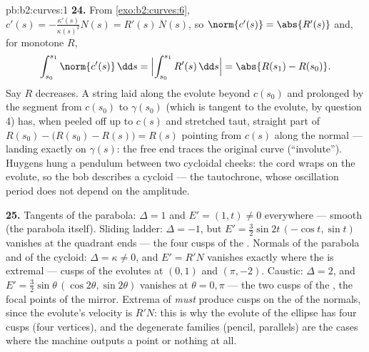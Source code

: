 \begin{solution}{pb:b2:curves:1}
\textbf{24.} From \cref{exo:b2:curves:6}, $c'(s) =
-\frac{\kappa'(s)}{\kappa(s)^2}N(s) = R'(s)\,N(s)$, so
$\norm{c'(s)} = \abs{R'(s)}$ and, for monotone $R$,
\[
\int_{s_0}^{s_1}\norm{c'(s)}\,\dd s =
\Bigl|\int_{s_0}^{s_1}R'(s)\,\dd s\Bigr| = \abs{R(s_1) -
R(s_0)} .
\]
Say $R$ decreases. A string laid along the evolute beyond
$c(s_0)$ and prolonged by the segment from $c(s_0)$ to
$\gamma(s_0)$ (which is tangent to the evolute, by question 4)
has, when peeled off up to $c(s)$ and stretched taut, straight
part of  $R(s_0) - \bigl(R(s_0) - R(s)\bigr) = R(s)$
pointing from $c(s)$ along the normal --- landing exactly on
$\gamma(s)$: the free end traces the original curve
(``involute''). Huygens hung a pendulum between two cycloidal
cheeks: the cord wraps on the evolute, so the bob describes a
cycloid --- the tautochrone, whose oscillation period does
not depend on the amplitude.

\textbf{25.} Tangents of the parabola: $\Delta = 1$ and $E' =
(1, t) \neq 0$ everywhere --- smooth  (the parabola
itself). Sliding ladder: $\Delta = -1$, but $E' =
\tfrac32\sin 2t\,(-\cos t, \sin t)$ vanishes at the quadrant
ends --- the four cusps of the . Normals of the
parabola and of the cycloid: $\Delta = \kappa \neq 0$, and
$E' = R'N$ vanishes exactly where the  is extremal
--- cusps of the evolutes at $(0,1)$ and $(\pi, -2)$. Caustic:
$\Delta = 2$, and $E' = \tfrac32\sin\theta\,(\cos2\theta,
\sin2\theta)$ vanishes at $\theta = 0, \pi$ --- the two cusps
of the , the focal points of the mirror. Extrema of
 \emph{must} produce cusps on the  of the
normals, since the evolute's velocity is $R'N$: this is why
the evolute of the ellipse has four cusps (four vertices),
and the degenerate families (pencil, parallels) are the cases
where the machine outputs a point or nothing at all.
\end{solution}
